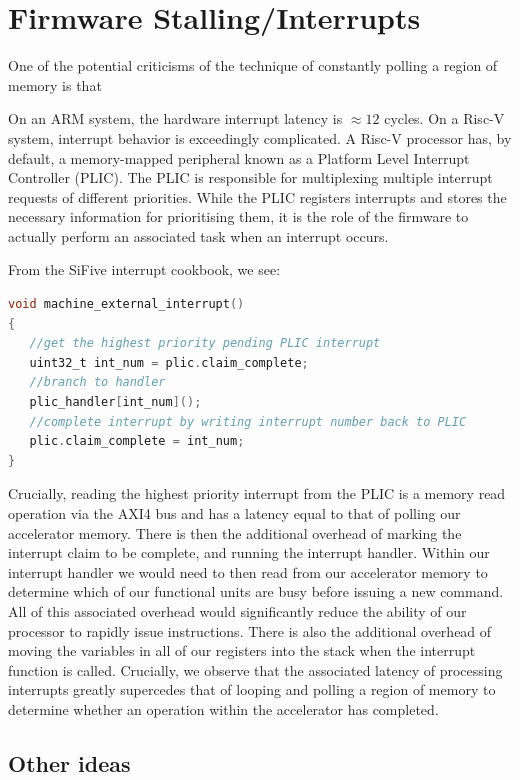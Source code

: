\documentclass[a4paper,8pt]{report}
\begin{document}
\section{Firmware Stalling/Interrupts}
One of the potential criticisms of the technique of constantly polling a region
of memory is that

On an ARM system, the hardware interrupt latency is $\approx 12$ cycles. On a
Risc-V system, interrupt behavior is exceedingly complicated. A Risc-V processor
has, by default, a memory-mapped peripheral known as a Platform Level Interrupt
Controller (PLIC). The PLIC is responsible for multiplexing multiple interrupt
requests of different priorities. While the PLIC registers interrupts and stores
the necessary information for prioritising them, it is the role of the firmware
to actually perform an associated task when an interrupt occurs.


From the SiFive interrupt cookbook, we see:
\begin{lstlisting}[language=C,style=customc]
void machine_external_interrupt()
{
   //get the highest priority pending PLIC interrupt
   uint32_t int_num = plic.claim_complete;
   //branch to handler
   plic_handler[int_num]();
   //complete interrupt by writing interrupt number back to PLIC
   plic.claim_complete = int_num;
}
\end{lstlisting}

Crucially, reading the highest priority interrupt from the PLIC is a memory
read operation via the AXI4 bus and has a latency equal to that of polling our
accelerator memory. There is then the additional overhead of marking the
interrupt claim to be complete, and running the interrupt handler. Within our
interrupt handler we would need to then read from our accelerator memory to
determine which of our functional units are busy before issuing a new command.
All of this associated overhead would significantly reduce the ability of our
processor to rapidly issue instructions. There is also the additional overhead
of moving the variables in all of our registers into the stack when the
interrupt function is called. Crucially, we observe that the associated latency
of processing interrupts greatly supercedes that of looping and polling a region
of memory to determine whether an operation within the accelerator has completed.


\subsection{Other ideas}
\end{document}
